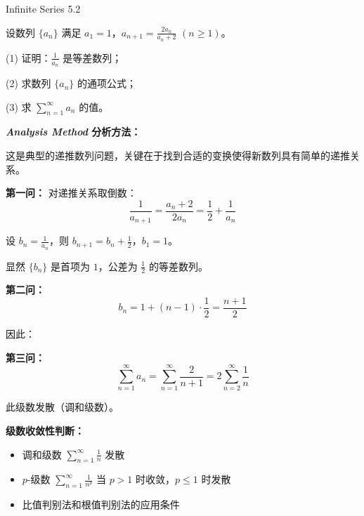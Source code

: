 \documentclass{ctexart}
\newcommand{\result}[1]{\tcbhighmath[colback=deepblue!15, colframe=deepblue, arc=3pt]{#1}}
\newcommand{\important}[1]{\textcolor{crimsonred}{\textbf{#1}}}
\begin{document}
\newpage

\begin{center}
    \begin{chaptertitle}{\faInfinity}{Infinite Series 5.2}
    \end{chaptertitle}
\end{center}

\begin{exercisebox}{5.1}
设数列 $\{a_n\}$ 满足 $a_1 = 1$，$a_{n+1} = \frac{2a_n}{a_n + 2}$ $(n \geq 1)$。

(1) 证明：$\frac{1}{a_n}$ 是等差数列；

(2) 求数列 $\{a_n\}$ 的通项公式；

(3) 求 $\sum_{n=1}^{\infty} a_n$ 的值。
\end{exercisebox}

\begin{analysisbox}
\textbf{\color{elegantpurple}\textit{Analysis Method} \quad 分析方法：}

这是典型的递推数列问题，关键在于找到合适的变换使得新数列具有简单的递推关系。

\textbf{第一问：} 对递推关系取倒数：
$$\frac{1}{a_{n+1}} = \frac{a_n + 2}{2a_n} = \frac{1}{2} + \frac{1}{a_n}$$

设 $b_n = \frac{1}{a_n}$，则 $b_{n+1} = b_n + \frac{1}{2}$，$b_1 = 1$。

显然 $\{b_n\}$ 是首项为 $1$，公差为 $\frac{1}{2}$ 的等差数列。

\textbf{第二问：} 
$$b_n = 1 + (n-1) \cdot \frac{1}{2} = \frac{n+1}{2}$$

因此：\result{a_n = \frac{1}{b_n} = \frac{2}{n+1}}

\textbf{第三问：} 
$$\sum_{n=1}^{\infty} a_n = \sum_{n=1}^{\infty} \frac{2}{n+1} = 2\sum_{n=2}^{\infty} \frac{1}{n}$$

此级数发散（调和级数）。
\end{analysisbox}

\begin{notebox}
\important{级数收敛性判断：}
\begin{itemize}[leftmargin=15pt, itemsep=5pt]
    \item 调和级数 $\sum_{n=1}^{\infty} \frac{1}{n}$ 发散
    \item $p$-级数 $\sum_{n=1}^{\infty} \frac{1}{n^p}$ 当 $p > 1$ 时收敛，$p \leq 1$ 时发散
    \item 比值判别法和根值判别法的应用条件
\end{itemize}
\end{notebox}

\setcounter{page}{150}
\end{document}
